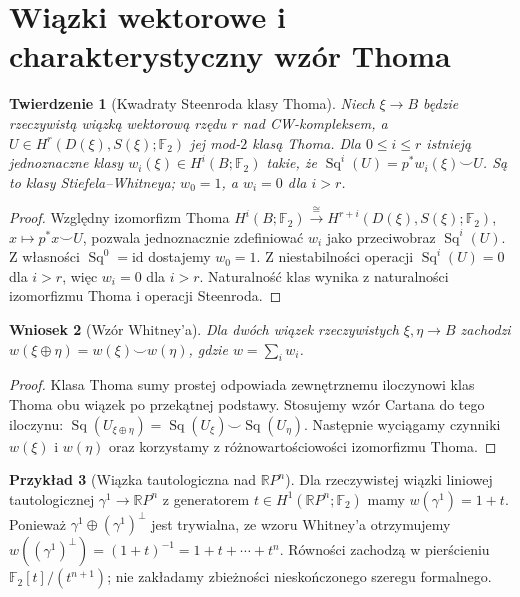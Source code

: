 \documentclass[11pt,a4paper,oneside]{report}
\newcommand{\F}{\mathbb{F}}
\newcommand{\R}{\mathbb{R}}
\newcommand{\id}{\mathrm{id}}
\theoremstyle{plain}
\newtheorem{twierdzenie}{Twierdzenie}[section]
\newtheorem{wniosek}[twierdzenie]{Wniosek}
\theoremstyle{definition}
\newtheorem{przyklad}[twierdzenie]{Przykład}
\theoremstyle{remark}
\begin{document}
\section{Wiązki wektorowe i charakterystyczny wzór Thoma}
\begin{twierdzenie}[Kwadraty Steenroda klasy Thoma]
\label{thm:thom-wu-v8}
Niech $\xi\to B$ będzie rzeczywistą wiązką wektorową
rzędu $r$ nad CW-kompleksem, a
$U\in H^r(D(\xi),S(\xi);\F_2)$ jej mod-$2$ klasą Thoma.
Dla $0\le i\le r$ istnieją jednoznaczne klasy
$w_i(\xi)\in H^i(B;\F_2)$ takie, że
$\operatorname{Sq}^i(U)=p^*w_i(\xi)\smile U$.
Są to klasy Stiefela--Whitneya; $w_0=1$,
a $w_i=0$ dla $i>r$.
\end{twierdzenie}
\begin{proof}
Względny izomorfizm Thoma
$H^i(B;\F_2)\xrightarrow{\cong}
H^{r+i}(D(\xi),S(\xi);\F_2)$,
$x\mapsto p^*x\smile U$,
pozwala jednoznacznie zdefiniować $w_i$ jako przeciwobraz
$\operatorname{Sq}^i(U)$. Z własności
$\operatorname{Sq}^0=\id$ dostajemy $w_0=1$.
Z niestabilności operacji $\operatorname{Sq}^i(U)=0$
dla $i>r$, więc $w_i=0$ dla $i>r$.
Naturalność klas wynika z naturalności izomorfizmu
Thoma i operacji Steenroda.
\end{proof}

\begin{wniosek}[Wzór Whitney'a]
Dla dwóch wiązek rzeczywistych $\xi,\eta\to B$
zachodzi $w(\xi\oplus\eta)=w(\xi)\smile w(\eta)$,
gdzie $w=\sum_iw_i$.
\end{wniosek}
\begin{proof}
Klasa Thoma sumy prostej odpowiada zewnętrznemu
iloczynowi klas Thoma obu wiązek po przekątnej podstawy.
Stosujemy wzór Cartana do tego iloczynu:
$\operatorname{Sq}(U_{\xi\oplus\eta})
 =\operatorname{Sq}(U_\xi)\smile\operatorname{Sq}(U_\eta)$.
Następnie wyciągamy czynniki $w(\xi)$ i $w(\eta)$
oraz korzystamy z różnowartościowości izomorfizmu Thoma.
\end{proof}

\begin{przyklad}[Wiązka tautologiczna nad $\R P^n$]
Dla rzeczywistej wiązki liniowej tautologicznej
$\gamma^1\to\R P^n$ z generatorem
$t\in H^1(\R P^n;\F_2)$ mamy $w(\gamma^1)=1+t$.
Ponieważ $\gamma^1\oplus(\gamma^1)^\perp$ jest trywialna,
ze wzoru Whitney'a otrzymujemy
$w((\gamma^1)^\perp)=(1+t)^{-1}=1+t+\cdots+t^n$.
Równości zachodzą w pierścieniu
$\F_2[t]/(t^{n+1})$; nie zakładamy zbieżności
nieskończonego szeregu formalnego.
\end{przyklad}
\end{document}
